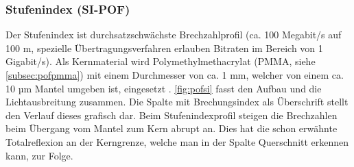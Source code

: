 \subsubsection{Stufenindex (SI-POF)}

Der Stufenindex ist durchsatzschwächste Brechzahlprofil (ca. 100 Megabit/s auf
100 m, spezielle Übertragungsverfahren erlauben Bitraten im Bereich von 1
Gigabit/s). Als Kernmaterial wird Polymethylmethacrylat (PMMA, siehe
\autoref{subsec:pofpmma}) mit einem Durchmesser von ca. 1 mm, welcher von einem
ca. 10 µm Mantel umgeben ist, eingesetzt \cite{pofacsi}. \autoref{fig:pofsi}
fasst den Aufbau und die Lichtausbreitung zusammen. Die Spalte mit
Brechungsindex als Überschrift stellt den Verlauf dieses grafisch dar. Beim
Stufenindexprofil steigen die Brechzahlen beim Übergang vom Mantel zum Kern
abrupt an. Dies hat die schon erwähnte Totalreflexion an der Kerngrenze, welche
man in der Spalte Querschnitt erkennen kann, zur Folge.


